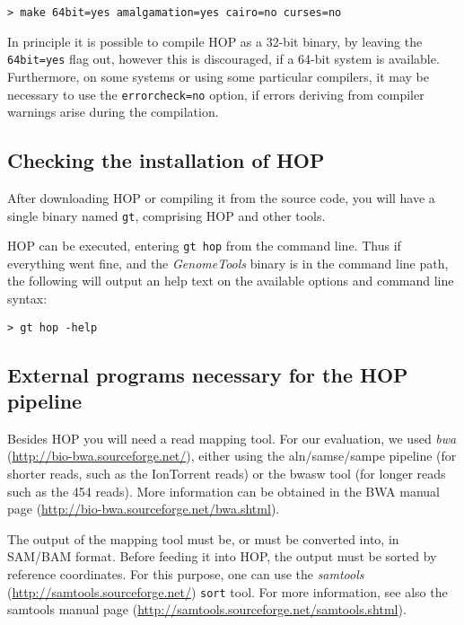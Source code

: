 \documentclass[12pt,titlepage]{article}
\newcommand{\GenomeTools}{\textit{GenomeTools}\xspace}
\newcommand{\Hop}{{HOP}\xspace}
\newcommand{\Gtcmd}{\texttt{gt}\xspace}
\begin{document}
\begin{footnotesize}
\begin{verbatim}
> make 64bit=yes amalgamation=yes cairo=no curses=no
\end{verbatim}
\end{footnotesize}

In principle it is possible to compile \Hop as a 32-bit binary, by
leaving the \texttt{64bit=yes} flag out, however this is discouraged,
if a 64-bit system is available. Furthermore, on some systems
or using some particular compilers, it may be necessary to use the
\texttt{errorcheck=no} option, if errors deriving from compiler warnings
arise during the compilation.

\subsection{Checking the installation of \Hop}

After downloading \Hop or compiling it from the source code, you
will have a single binary named \Gtcmd, comprising \Hop and other tools.

\Hop can be executed, entering \texttt{gt hop} from the command line.
Thus if everything went fine, and the \GenomeTools binary is in
the command line path, the following will output an help text on the
available options and command line syntax:

\begin{footnotesize}
\begin{verbatim}
> gt hop -help
\end{verbatim}
\end{footnotesize}

\subsection{External programs necessary for the \Hop pipeline}

Besides \Hop you will need a read mapping tool. For our evaluation,
we used \textit{bwa} (\url{http://bio-bwa.sourceforge.net/}),
either using the aln/samse/sampe pipeline (for shorter reads, such
as the IonTorrent reads) or the bwasw tool (for longer reads such as
the 454 reads). More information can be obtained
in the BWA manual page (\url{http://bio-bwa.sourceforge.net/bwa.shtml}).

The output of the mapping tool must be, or must be converted into,
in SAM/BAM format. Before feeding it into \Hop, the output must be sorted
by reference coordinates. For this purpose, one can use
the \textit{samtools} (\url{http://samtools.sourceforge.net/}) \texttt{sort}
tool. For more information, see also the samtools manual page
(\url{http://samtools.sourceforge.net/samtools.shtml}).
\end{document}
